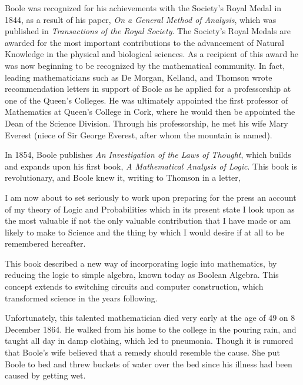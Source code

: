 \documentclass[12]{article} %
\begin{document}
Boole was recognized for his achievements with the Society's Royal Medal in 1844, as a result of his paper, \textit {On a General Method of Analysis}, which was published in \textit{Transactions of the Royal Society}.  The Society's Royal Medals are awarded for the most important contributions to the advancement of Natural Knowledge in the physical and biological sciences. As a recipient of this award he was now beginning to be recognized by the mathematical community. In fact, leading mathematicians such as De Morgan, Kelland, and Thomson wrote recommendation letters in support of Boole as he applied for a professorship at one of the Queen's Colleges. He was ultimately appointed the first professor of Mathematics at Queen's College in Cork, where he would then be appointed the Dean of the Science Division. Through his professorship, he met his wife Mary Everest (niece of Sir George Everest, after whom the mountain is named).

In 1854, Boole publishes \textit{An Investigation of the Laws of Thought}, which builds and expands upon his first book, \textit{A Mathematical Analysis of Logic}. This book is revolutionary, and Boole knew it, writing to Thomson in a letter, 
\begin{displayquote}
I am now about to set seriously to work upon preparing for the press an account of my theory of Logic and Probabilities which in its present state I look upon as the most valuable if not the only valuable contribution that I have made or am likely to make to Science and the thing by which I would desire if at all to be remembered hereafter.
\end{displayquote}
\noindent This book described a new way of incorporating logic into mathematics, by reducing the logic to simple algebra, known today as Boolean Algebra. This concept extends to switching circuits and computer construction, which transformed science in the years following.

Unfortunately, this talented mathematician died very early at the age of 49 on 8 December 1864. He walked from his home to the college in the pouring rain, and taught all day in damp clothing, which led to pneumonia. Though it is rumored that Boole's wife believed that a remedy should resemble the cause. She put Boole to bed and threw buckets of water over the bed since his illness had been caused by getting wet. 
\end{document}
